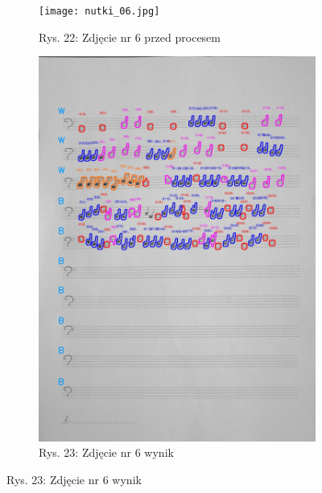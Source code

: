 \documentclass[11pt]{article}
\begin{document}
\begin{figure}
\begin{subfigure}[b]{0.475\textwidth}
        \texttt{[image: nutki\_06.jpg]}
        \caption[]%
        {{\small Rys. 22: Zdjęcie nr 6 przed procesem}}
        \label{fig:sub3}
    \end{subfigure}
    \quad
    \begin{subfigure}[b]{0.475\textwidth}
        \centering
        \graphicspath{ {blobs/} }
        \includegraphics[width=\textwidth]{6_cnts.jpg}
        \caption[]%
        {{\small Rys. 23: Zdjęcie nr 6 wynik}}
        \label{fig:sub 4}
    \end{subfigure}
    \label{fig 1}
\end{figure}

\FloatBarrier
\end{document}
